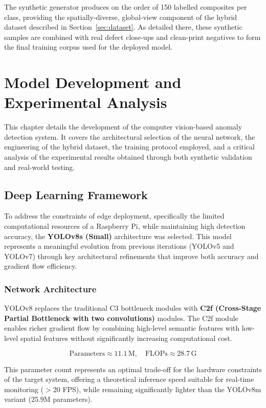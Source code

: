\documentclass[english, Lau, oneside]{sapthesis}
\begin{document}
The synthetic generator produces on the order of 150 labelled composites per class, providing the spatially-diverse, global-view component of the hybrid dataset described in Section~\ref{sec:dataset}. As detailed there, these synthetic samples are combined with real defect close-ups and clean-print negatives to form the final training corpus used for the deployed model.

\chapter{Model Development and Experimental Analysis}
\label{chap:model_development}

This chapter details the development of the computer vision-based anomaly detection system. It covers the architectural selection of the neural network, the engineering of the hybrid dataset, the training protocol employed, and a critical analysis of the experimental results obtained through both synthetic validation and real-world testing.

\section{Deep Learning Framework}
\label{sec:framework}

To address the constraints of edge deployment, specifically the limited computational resources of a Raspberry Pi, while maintaining high detection accuracy, the \textbf{YOLOv8s (Small)} architecture was selected. This model represents a meaningful evolution from previous iterations (YOLOv5 and YOLOv7) through key architectural refinements that improve both accuracy and gradient flow efficiency.

\subsection{Network Architecture}
YOLOv8 replaces the traditional C3 bottleneck modules with \textbf{C2f (Cross-Stage Partial Bottleneck with two convolutions)} modules. The C2f module enables richer gradient flow by combining high-level semantic features with low-level spatial features without significantly increasing computational cost.

\begin{equation}
    \text{Parameters} \approx 11.1\,\text{M}, \quad \text{FLOPs} \approx 28.7\,\text{G}
\end{equation}

This parameter count represents an optimal trade-off for the hardware constraints of the target system, offering a theoretical inference speed suitable for real-time monitoring ($>$20 FPS), while remaining significantly lighter than the YOLOv8m variant (25.9M parameters).
\end{document}
